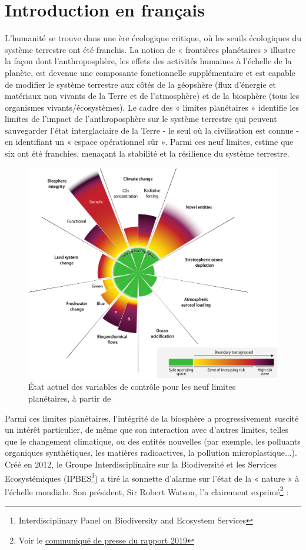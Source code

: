 {}
\onehalfspacing
\chapter*{Introduction en français }

L'humanité se trouve dans une ère écologique critique, où les seuils écologiques du système terrestre ont été franchis. La notion de « frontières planétaires » \citep{rockstrom2009safe,steffen_2015_planetary} illustre la façon dont l'anthroposphère, les effets des activités humaines à l'échelle de la planète, est devenue une composante fonctionnelle supplémentaire et est capable de modifier le système terrestre \citep{richardson_earth_2023} aux côtés de la géopshère (flux d'énergie et matériaux non vivants de la Terre et de l'atmosphère) et de la biosphère (tous les organismes vivants/écosystèmes). Le cadre des « limites planétaires » identifie les limites de l'impact de l'anthroposphère sur le système terrestre qui peuvent sauvegarder l'état interglaciaire de la Terre - le seul où la civilisation est connue - en identifiant un « espace opérationnel sûr ». Parmi ces neuf limites, \cite{richardson_earth_2023} estime que six ont été franchies, menaçant la stabilité et la résilience du système terrestre. 

\begin{figure}[h]
	\centering
	\includegraphics[width= .7\textwidth]{figures/intro/planetary_bounds.jpg}
	\caption{État actuel des variables de contrôle pour les neuf limites planétaires, à partir de \cite{richardson_earth_2023}}
\end{figure}

Parmi ces limites planétaires, l'intégrité de la biosphère a progressivement suscité un intérêt particulier, de même que son interaction avec d'autres limites, telles que le changement climatique, ou des entités nouvelles (par exemple, les polluants organiques synthétiques, les matières radioactives, la pollution microplastique...). Créé en 2012, le Groupe Interdisciplinaire sur la Biodiversité et les Services Ecosystémiques (IPBES\footnote{Interdisciplinary Panel on Biodiversity and Ecosystem Services}) a tiré la sonnette d'alarme sur l'état de la « nature » à l'échelle mondiale. Son président, Sir Robert Watson, l'a clairement exprimé\footnote{Voir le \href{https://www.ipbes.net/news/Media-Release-Global-Assessment}{communiqué de presse du rapport 2019}} :


